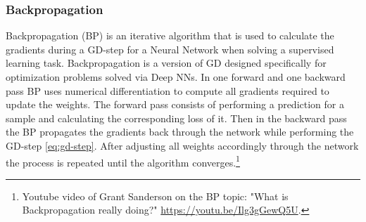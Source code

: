 \subsubsection{Backpropagation}
Backpropagation (BP) is an iterative algorithm that is used to calculate the gradients during a GD-step for a Neural Network when solving a supervised learning task.
Backpropagation is a version of GD designed specifically for optimization problems solved via Deep NNs.
In one forward and one backward pass BP uses numerical differentiation to compute all gradients required to update the weights.
The forward pass consists of performing a prediction for a sample and calculating the corresponding loss of it.
Then in the backward pass the BP propagates the gradients back through the network while performing the GD-step \eqref{eq:gd-step}.
After adjusting all weights accordingly through the network the process is repeated until the algorithm converges.\footnote{
    Youtube video of Grant Sanderson on the BP topic: "What is Backpropagation really doing?" \url{https://youtu.be/Ilg3gGewQ5U}.
}

